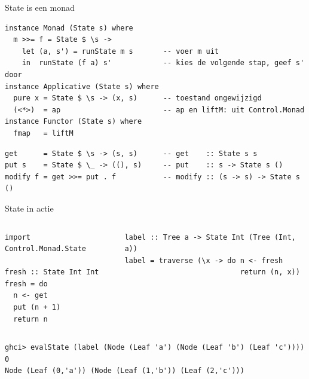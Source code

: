 \documentclass[aspectratio=169,11pt]{beamer}
\begin{document}
\begin{frame}[fragile]{State is een monad}
\begin{lstlisting}
instance Monad (State s) where
  m >>= f = State $ \s ->
    let (a, s') = runState m s       -- voer m uit
    in  runState (f a) s'            -- kies de volgende stap, geef s' door
instance Applicative (State s) where
  pure x = State $ \s -> (x, s)      -- toestand ongewijzigd
  (<*>)  = ap                        -- ap en liftM: uit Control.Monad
instance Functor (State s) where
  fmap   = liftM
\end{lstlisting}
  \pause
\begin{lstlisting}
get      = State $ \s -> (s, s)      -- get    :: State s s
put s    = State $ \_ -> ((), s)     -- put    :: s -> State s ()
modify f = get >>= put . f           -- modify :: (s -> s) -> State s ()
\end{lstlisting}
\end{frame}
 
\begin{frame}[fragile]{State in actie}
  \begin{columns}[T]
\begin{lstlisting}
import Control.Monad.State
 
fresh :: State Int Int
fresh = do
  n <- get
  put (n + 1)
  return n
\end{lstlisting}
\begin{lstlisting}
label :: Tree a -> State Int (Tree (Int, a))
label = traverse (\x -> do n <- fresh
                           return (n, x))
\end{lstlisting}
  \end{columns}
  \pause
\begin{lstlisting}
ghci> evalState (label (Node (Leaf 'a') (Node (Leaf 'b') (Leaf 'c')))) 0
Node (Leaf (0,'a')) (Node (Leaf (1,'b')) (Leaf (2,'c')))
\end{lstlisting}
\end{frame}
 
\end{document}
